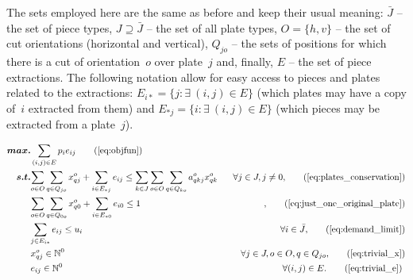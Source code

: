 The sets employed here are the same as before and keep their usual meaning: \(\bar{J}\) -- the set of piece types, \(J \supseteq \bar{J}\) -- the set of all plate types, \(O = \{h, v\}\) -- the set of cut orientations (horizontal and vertical), \(Q_{jo}\) -- the sets of positions for which there is a cut of orientation~\(o\) over plate~\(j\) and, finally, \(E\) -- the set of piece extractions.
The following notation allow for easy access to pieces and plates related to the extractions: \(E_{i*} = \{ j : \exists~(i, j) \in E \}\) (which plates may have a copy of~\(i\) extracted from them) and \(E_{*j} = \{i : \exists~(i, j) \in E \}\) (which pieces may be extracted from a plate~\(j\)).

\begin{align*}
\bm{max.} &\sum_{(i, j) \in E} p_i e_{ij} \tag{\ref{eq:objfun}}\\
\bm{s.t.} &\specialcell{\sum_{o \in O}\sum_{q \in Q_{jo}} x^o_{qj} + \sum_{i \in E_{*j}} e_{ij} \leq \sum_{k \in J}\sum_{o \in O}\sum_{q \in Q_{ko}} a^o_{qkj} x^o_{qk} \hspace*{0.05\textwidth} \forall j \in J, j \neq 0,}\tag{\ref{eq:plates_conservation}}\\
	    & \specialcell{\sum_{o \in O}\sum_{q \in Q_{0o}} x^o_{q0} + \sum_{i \in E_{*0}} e_{i0} \leq 1 \hspace*{\fill},}\tag{\ref{eq:just_one_original_plate}}\\
            & \specialcell{\sum_{j \in E_{i*}} e_{ij} \leq u_i \hspace*{\fill} \forall i \in \bar{J},}\tag{\ref{eq:demand_limit}}\\
	    & \specialcell{x^o_{qj} \in \mathbb{N}^0 \hspace*{\fill} \forall j \in J, o \in O, q \in Q_{jo},}\tag{\ref{eq:trivial_x}}\\
            & \specialcell{e_{ij} \in \mathbb{N}^0 \hspace*{\fill} \forall (i, j) \in E.}\tag{\ref{eq:trivial_e}}
\end{align*}

